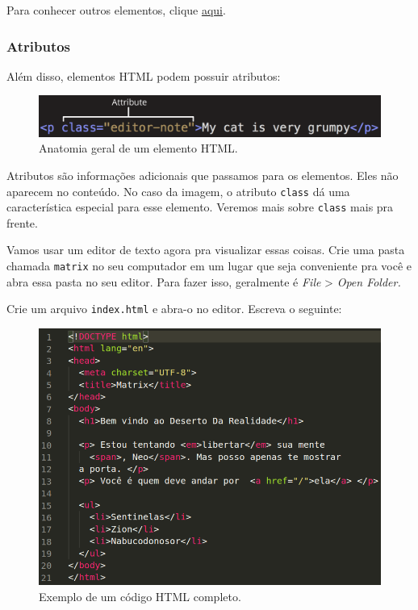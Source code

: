 Para conhecer outros elementos, clique
\href{https://developer.mozilla.org/en-US/docs/Web/HTML/Element}{aqui}.


\subsubsection{Atributos}
Além disso, elementos HTML podem possuir atributos:

\begin{figure}[h!]
    \centering
    \includegraphics[scale=.3]{imgs/attrs.png}
    \caption{Anatomia geral de um elemento HTML.}
    \label{fig:attrs}
\end{figure}

Atributos são informações adicionais que passamos para os elementos.
Eles não aparecem no conteúdo. No caso da imagem, o atributo
\texttt{class} dá uma característica especial para esse elemento.
Veremos mais sobre \texttt{class} mais pra frente.


Vamos usar um editor de texto agora pra visualizar essas coisas. Crie
uma pasta chamada \texttt{matrix} no seu computador em um lugar que seja
conveniente pra você e abra essa pasta no seu editor. Para fazer isso,
geralmente é \emph{File} \textgreater{} \emph{Open Folder.}

Crie um arquivo \texttt{index.html} e abra-o no editor. Escreva o
seguinte:

\begin{figure}[h!]
    \centering
    \includegraphics[scale=.4]{imgs/full-html-example.png}
    \caption{Exemplo de um código HTML completo.}
    \label{fig:full-html-example}
\end{figure}



